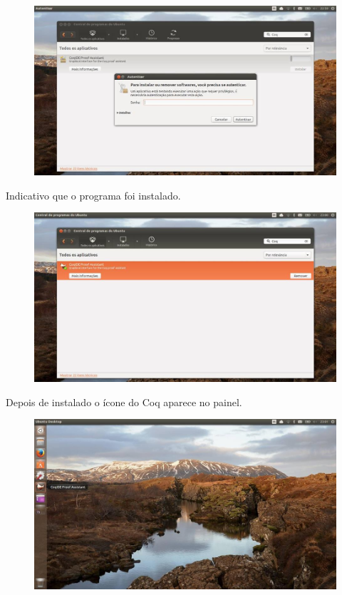 \begin{figure}[!htb]
\includegraphics[scale=0.4]{imagens/linux1.jpg}
\end{figure}
Indicativo que o programa foi instalado.\\
\begin{figure}[!htb]
\includegraphics[scale=0.4]{imagens/linux3.jpg}
\end{figure}
Depois de instalado o \'{i}cone do Coq aparece no painel.\\
\begin{figure}[!htb]
\includegraphics[scale=0.4]{imagens/linux6.jpg}
\end{figure}
